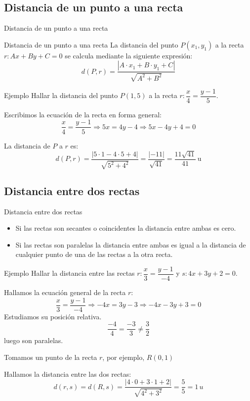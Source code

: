 \documentclass[8pt]{beamer}
\begin{document}
\subsection{Distancia de un punto a una recta}
\begin{frame}[t]{Distancia de un punto a una recta}

\begin{alertblock}{Distancia de un punto a una recta}
La distancia del punto $P(x_1,y_1)$ a la recta $r : Ax+By+C=0$ se calcula mediante la siguiente expresión:
\[ d(P,r)=\dfrac{|A\cdot x_1+B\cdot y_1+C|}{\sqrt{A^2+B^2}} \]
\end{alertblock}
\pause
\begin{exampleblock}{Ejemplo}
Hallar la distancia del punto $P(1,5)$ a la recta $r : \dfrac{x}{4}=\dfrac{y-1}{5}$.
\end{exampleblock}
\pause
Escribimos la ecuación de la recta en forma general:
\[ \dfrac{x}{4}=\dfrac{y-1}{5} \Rightarrow 5x=4y-4 \Rightarrow 5x-4y+4=0 \]

\pause
La distancia de $P$ a $r$ es:
\[ d(P,r)=\dfrac{|5\cdot 1 -4\cdot 5 +4 | }{\sqrt{5^2+4^2}}= \dfrac{|-11|}{\sqrt{41}}= \dfrac{11\sqrt{41}}{41} \, \text{u} \]
\end{frame}

\subsection{Distancia entre dos rectas}
\begin{frame}[t]{Distancia entre dos rectas}

\begin{itemize}[<+->]
\item Si las rectas son secantes o coincidentes la distancia entre ambas es cero.
\item Si las rectas son paralelas la distancia entre ambas es igual a la distancia de cualquier punto de una de las rectas a la otra recta.
\end{itemize}

\pause
\begin{exampleblock}{Ejemplo}
Hallar la distancia entre las rectas $r: \dfrac{x}{3}= \dfrac{y-1}{-4}$ y $s:4x+3y + 2 = 0 $. 
\end{exampleblock}

\pause
Hallamos la ecuación general de la recta $r$:
\[ \dfrac{x}{3}=\dfrac{y-1}{-4} \Rightarrow -4x=3y-3 \Rightarrow -4x-3y+3=0 \]
\pause
Estudiamos su posición relativa.
\[ \dfrac{-4}{4}=\dfrac{-3}{3} \neq \dfrac{3}{2} \]
luego son paralelas.

\pause
Tomamos un punto de la recta $r$, por ejemplo, $R(0,1)$
\pause

Hallamos la distancia entre las dos rectas:
\[ d(r,s)=d(R,s)=\dfrac{|4\cdot 0+3\cdot 1 +2|}{\sqrt{4^2+3^2}}= \dfrac{5}{5}= 1 \, u \]
\end{frame}
\end{document}
